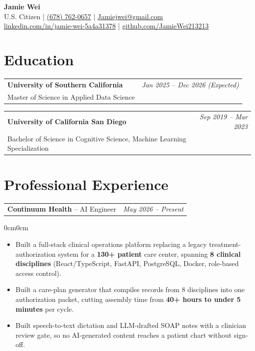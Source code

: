 \documentclass[10pt,letterpaper]{article}
\newenvironment{highlights}{
  \begin{itemize}[
    topsep=0.015cm,
    parsep=0cm,
    partopsep=0pt,
    itemsep=0.01cm,
    leftmargin=12pt
  ]
}{
  \end{itemize}
}
\newenvironment{onecolentry}{
  \begin{adjustwidth}{0cm}{0cm}
}{
  \end{adjustwidth}
}
\begin{document}
\fontsize{9.5pt}{10.8pt}\selectfont
 
\begin{center}
  {\Huge\textbf{Jamie Wei}}\\[3pt]
  U.S. Citizen
  \quad|\quad
  \href{tel:+16787620657}{(678) 762-0657}
  \quad|\quad
  \href{mailto:Jamiejwei@gmail.com}{Jamiejwei@gmail.com}\\[3pt]
  \href{https://www.linkedin.com/in/jamie-wei-5a4a31378/}{linkedin.com/in/jamie-wei-5a4a31378}
  \quad|\quad
  \href{https://github.com/JamieWei213213}{github.com/JamieWei213213}
\end{center}
 
\section{Education}
 
\begin{tabularx}{\textwidth}{Xr}
  \textbf{University of Southern California}
  & \textit{Jan 2025 -- Dec 2026 (Expected)}\\
  Master of Science in Applied Data Science & \\
\end{tabularx}
 
\vspace{0.03cm}
 
\begin{tabularx}{\textwidth}{Xr}
  \textbf{University of California San Diego}
  & \textit{Sep 2019 -- Mar 2023}\\
  Bachelor of Science in Cognitive Science, Machine Learning Specialization & \\
\end{tabularx}
 
\section{Professional Experience}
 
\begin{tabularx}{\textwidth}{Xr}
  \textbf{Continuum Health} -- AI Engineer
  & \textit{May 2026 -- Present}
\end{tabularx}
 
\begin{onecolentry}
\begin{highlights}
  \item Built a full-stack clinical operations platform replacing a legacy treatment-authorization system for a \textbf{130+ patient} care center, spanning \textbf{8 clinical disciplines} (React/TypeScript, FastAPI, PostgreSQL, Docker, role-based access control).
  \item Built a care-plan generator that compiles records from 8 disciplines into one authorization packet, cutting assembly time from \textbf{40+ hours to under 5 minutes} per cycle.
  \item Built speech-to-text dictation and LLM-drafted SOAP notes with a clinician review gate, so no AI-generated content reaches a patient chart without sign-off.
\end{highlights}
\end{onecolentry}
 
\end{document}
